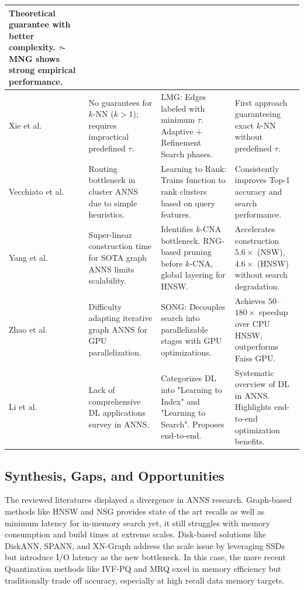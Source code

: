 \documentclass[conference]{IEEEtran}
\begin{document}
\begin{table}[t]
\begin{tabularx}{\textwidth}{
    >{\RaggedRight}p{} 
    >{\RaggedRight}p{} 
    >{\RaggedRight}p{} 
    >{\RaggedRight\arraybackslash}X
}
Theoretical guarantee with better complexity. $\tau$-MNG shows strong empirical performance. \\
\midrule
Xie et al. \cite{xie2025} & 
No guarantees for $k$-NN ($k>1$); requires impractical predefined $\tau$. & 
LMG: Edges labeled with minimum $\tau$. Adaptive + Refinement Search phases. & 
First approach guaranteeing exact $k$-NN without predefined $\tau$. \\
\midrule
Vecchiato et al. \cite{vecchiato2024} & 
Routing bottleneck in cluster ANNS due to simple heuristics. & 
Learning to Rank: Trains function to rank clusters based on query features. & 
Consistently improves Top-1 accuracy and search performance. \\
\midrule
Yang et al. \cite{yang2025} & 
Super-linear construction time for SOTA graph ANNS limits scalability. & 
Identifies $k$-CNA bottleneck. RNG-based pruning before $k$-CNA, global layering for HNSW. & 
Accelerates construction $5.6\times$ (NSW), $4.6\times$ (HNSW) without search degradation. \\
\midrule
Zhao et al. \cite{zhao2020} & 
Difficulty adapting iterative graph ANNS for GPU parallelization. & 
SONG: Decouples search into parallelizable stages with GPU optimizations. & 
Achieves $50$--$180\times$ speedup over CPU HNSW, outperforms Faiss GPU. \\
\midrule
Li et al. \cite{li2023} & 
Lack of comprehensive DL applications survey in ANNS. & 
Categorizes DL into "Learning to Index" and "Learning to Search". Proposes end-to-end. & 
Systematic overview of DL in ANNS. Highlights end-to-end optimization benefits. \\
\bottomrule
\end{tabularx}
\end{table}

\subsection{Synthesis, Gaps, and Opportunities}
The reviewed literatures displayed a divergence in ANNS research. Graph-based methods like HNSW and NSG provides state of the art recalls as well as minimum latency for in-memory search yet, it still struggles with memory consumption and build times at extreme scales. Disk-based solutions like DiskANN, SPANN, and XN-Graph address the scale issue by leveraging SSDs but introduce I/O latency as the new bottleneck. In this case, the more recent Quantization methods like IVF-PQ and MRQ excel in memory efficiency but traditionally trade off accuracy, especially at high recall data memory targets.
\end{document}
